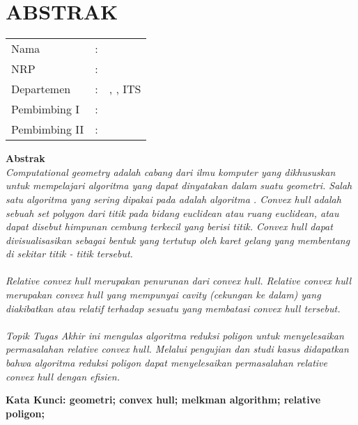 \chapter {ABSTRAK}


\noindent\textbf{\MakeUppercase\judul}
\vspace*{1em}

\begin{tabularx}{\linewidth}{ l l p{2.2in} }
	Nama 			& : & \penulis \\
	NRP 			& :	& \nrp \\
	Departemen 		& : & \jurusan, \newline \fakultas, ITS \\
	Pembimbing I 	& : & \pembimbingsatu \\
	Pembimbing II 	& : & \pembimbingdua
	\vspace*{1em} 	%
\end {tabularx}

\noindent\textbf{Abstrak} \\
\itshape
\textit{Computational geometry} adalah cabang dari ilmu komputer yang dikhususkan untuk mempelajari algoritma yang dapat dinyatakan dalam suatu geometri. Salah satu algoritma yang sering dipakai pada \CG adalah algoritma \CH. \textit{Convex hull} adalah sebuah set polygon dari titik pada bidang \textit{euclidean} atau ruang \textit{euclidean}, atau dapat disebut himpunan cembung terkecil yang berisi titik. Convex hull dapat divisualisasikan sebagai bentuk yang tertutup oleh karet gelang yang membentang di sekitar titik - titik tersebut.\\\\
\textit{Relative convex hull} merupakan penurunan dari \textit{convex hull}. \textit{Relative convex hull} merupakan \textit{convex hull} yang mempunyai \textit{cavity} (cekungan ke dalam) yang diakibatkan atau relatif terhadap sesuatu yang membatasi \textit{convex hull} tersebut. \\\\
Topik Tugas Akhir ini mengulas algoritma reduksi poligon untuk menyelesaikan permasalahan \textit{relative convex hull}. Melalui pengujian dan studi kasus didapatkan bahwa algoritma reduksi poligon dapat menyelesaikan permasalahan \textit{relative convex hull} dengan efisien.

\vspace*{1em}
\noindent\bfseries Kata Kunci: geometri; convex hull; melkman algorithm; relative poligon;
\normalfont
\cleardoublepage

